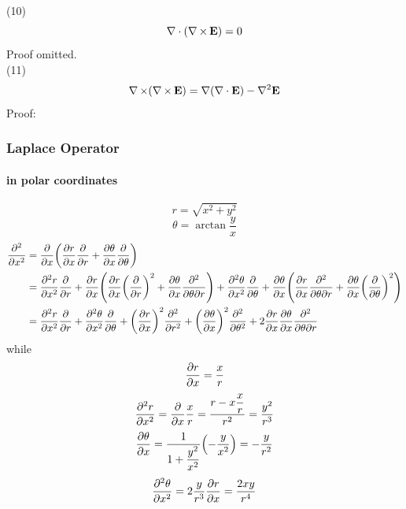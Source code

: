 \documentclass[UTF8]{ctexart} %
\DeclareMathOperator{\ti}{\times}
\numberwithin{equation}{section}
\begin{document}
(10) \begin{equation}\label{key}
\nabla\cdot(\nabla\ti\vb{E})=0
\end{equation}
Proof omitted.\\
(11) \begin{equation}\label{key}
\nabla\ti(\nabla\ti\vb{E})=\nabla(\nabla\cdot\vb{E})-\nabla^2\vb{E}
\end{equation}
Proof:\\
\subsubsection{Laplace Operator}
\paragraph{in polar coordinates}
\begin{equation}\label{key}
r=\sqrt{x^2+y^2}
\end{equation}
\begin{equation}\label{key}
\theta=\arctan{\dfrac{y}{x}}
\end{equation}
\begin{equation}\label{key}
\begin{aligned}
\pdv[2]{x} &=\pdv{x}\qty(\pdv{r}{x}\pdv{r}+\pdv{\theta}{x}\pdv{\theta})\\
&=\pdv[2]{r}{x}\pdv{r}+\pdv{r}{x}\qty(\pdv{r}{x}\qty(\pdv{r})^2+\pdv{\theta}{x}\pdv[2]{}{\theta}{r}) +\pdv[2]{\theta}{x}\pdv{\theta}+\pdv{\theta}{x}\qty(\pdv{r}{x}\pdv[2]{}{\theta}{r}+\pdv{\theta}{x}\qty(\pdv{\theta})^2)\\
&=\pdv[2]{r}{x}\pdv{r}+\pdv[2]{\theta}{x}\pdv{\theta}+\qty(\pdv{r}{x})^2\pdv[2]{r}+\qty(\pdv{\theta}{x})^2\pdv[2]{\theta}+2\pdv{r}{x}\pdv{\theta}{x}\pdv[2]{}{\theta}{r}
\end{aligned}
\end{equation}
while
\begin{equation}\label{key}
\pdv{r}{x}=\dfrac{x}{r}
\end{equation}
\begin{equation}\label{key}
\pdv[2]{r}{x}=\pdv{x}\dfrac{x}{r}=\dfrac{r-x\dfrac{x}{r}}{r^2}=\dfrac{y^2}{r^3}
\end{equation}
\begin{equation}\label{key}
\pdv{\theta}{x}=\dfrac{1}{1+\dfrac{y^2}{x^2}}\qty(-\dfrac{y}{x^2})=-\dfrac{y}{r^2}
\end{equation}
\begin{equation}\label{key}
\pdv[2]{\theta}{x}=2\dfrac{y}{r^3}\pdv{r}{x}=\dfrac{2xy}{r^4}
\end{equation}
\end{document}
